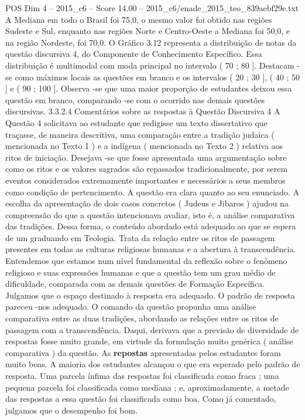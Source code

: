 \begin{textsample}{POS Dim 4 – 2015\_c6 – Score 14.00 – 2015\_c6/enade\_2015\_teo\_839aebf29e.txt}
A Mediana em todo o Brasil foi 75,0, o mesmo valor foi obtido nas regiões Sudeste e Sul, enquanto nas regiões Norte e Centro-Oeste a Mediana foi 50,0, e na região Nordeste, foi 70,0.
O Gráfico 3.12 representa a distribuição de notas da questão discursiva 4, do Componente de Conhecimento Específico.
Essa distribuição é multimodal com moda principal no intervalo ( 70 ; 80 ].
Destacam -se como máximos locais as questões em branco e os intervalos ( 20 ; 30 ], ( 40 ; 50 ] e ( 90 ; 100 ].
Observa -se que uma maior proporção de estudantes deixou essa questão em branco, comparando -se com o ocorrido nas demais questões discursivas. 3.3.2.4 Comentários sobre as respostas à Questão Discursiva 4 A Questão 4 solicitava ao estudante que redigisse um texto dissertativo que traçasse, de maneira descritiva, uma comparação entre a tradição judaica ( mencionada no Texto 1 ) e a indígena ( mencionada no Texto 2 ) relativa aos ritos de iniciação.
Desejava -se que fosse apresentada uma argumentação sobre como os ritos e os valores sagrados são repassados tradicionalmente, por serem eventos considerados extremamente importantes e necessários a seus membros como condição de pertencimento.
A questão era clara quanto ao seu enunciado.
A escolha da apresentação de dois casos concretos ( Judeus e Jibaros ) ajudou na compreensão do que a questão intencionava avaliar, isto é, a análise comparativa das tradições.
Dessa forma, o conteúdo abordado está adequado ao que se espera de um graduando em Teologia.
Trata da relação entre os ritos de passagem presentes em todas as culturas religiosas humanas e a abertura à transcendência.
Entendemos que estamos num nível fundamental da reflexão sobre o fenômeno religioso e suas expressões humanas e que a questão tem um grau médio de dificuldade, comparada com as demais questões de Formação Específica.
Julgamos que o espaço destinado à resposta era adequado.
O padrão de resposta pareceu -nos adequado.
O comando da questão propunha uma análise comparativa entre as duas tradições, abordando as relações entre os ritos de passagem com a transcendência.
Daqui, derivava que a previsão de diversidade de respostas fosse muito grande, em virtude da formulação muito genérica ( análise comparativa ) da questão.
As \textbf{repostas} apresentadas pelos estudantes foram muito boas.
A maioria dos estudantes alcançou o que era esperado pelo padrão de resposta.
Uma parcela ínfima das respostas foi classificada como fraca ; uma pequena parcela foi classificada como mediana ; e, aproximadamente, a metade das respostas a essa questão foi classificada como boa.
Como já comentado, julgamos que o desempenho foi bom.

\end{textsample}
